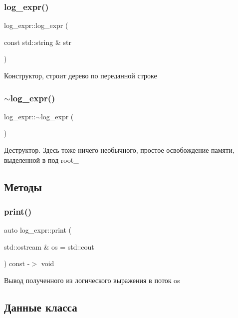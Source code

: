 \subsubsection{\texorpdfstring{log\+\_\+expr()}{log\_expr()}}
{\footnotesize\ttfamily log\+\_\+expr\+::log\+\_\+expr (\begin{DoxyParamCaption}\item[{const std\+::string \&}]{str }\end{DoxyParamCaption})}

Конструктор, строит дерево по переданной строке \mbox{\label{classlog__expr_a311a852d7b7dbca17d1f2f612445fa01}} 
\subsubsection{\texorpdfstring{$\sim$log\+\_\+expr()}{~log\_expr()}}
{\footnotesize\ttfamily log\+\_\+expr\+::$\sim$log\+\_\+expr (\begin{DoxyParamCaption}{ }\end{DoxyParamCaption})}

Деструктор. Здесь тоже ничего необычного, простое освобождение памяти, выделенной в под root\+\_\+ 

\subsection{Методы}
\mbox{\label{classlog__expr_ad05d17c0af134cc5d026e909ca73bc7a}} 
\subsubsection{\texorpdfstring{print()}{print()}}
{\footnotesize\ttfamily auto log\+\_\+expr\+::print (\begin{DoxyParamCaption}\item[{std\+::ostream \&}]{os = {\ttfamily std\+:\+:cout} }\end{DoxyParamCaption}) const -\/$>$ void}

Вывод полученного из логического выражения в поток os 

\subsection{Данные класса}
\mbox{\label{classlog__expr_a9390f80da7f2b5ca3a7023ec76ecf2cd}} 

